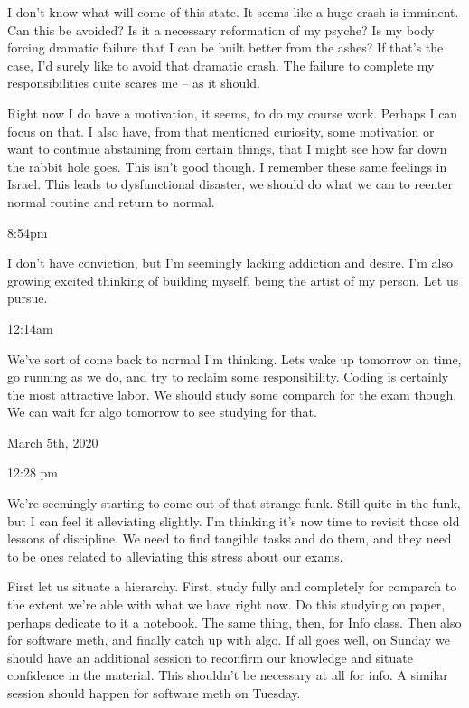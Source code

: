 I don't know what will come of this state. It seems like a huge crash is
imminent. Can this be avoided? Is it a necessary reformation of my
psyche? Is my body forcing dramatic failure that I can be built better
from the ashes? If that's the case, I'd surely like to avoid that
dramatic crash. The failure to complete my responsibilities quite scares
me -- as it should.

Right now I do have a motivation, it seems, to do my course work.
Perhaps I can focus on that. I also have, from that mentioned curiosity,
some motivation or want to continue abstaining from certain things, that
I might see how far down the rabbit hole goes. This isn't good though. I
remember these same feelings in Israel. This leads to dysfunctional
disaster, we should do what we can to reenter normal routine and return
to normal.

8:54pm

I don't have conviction, but I'm seemingly lacking addiction and desire.
I'm also growing excited thinking of building myself, being the artist
of my person. Let us pursue.

12:14am

We've sort of come back to normal I'm thinking. Lets wake up tomorrow on
time, go running as we do, and try to reclaim some responsibility.
Coding is certainly the most attractive labor. We should study some
comparch for the exam though. We can wait for algo tomorrow to see
studying for that.

\bigskip
\bigskip
March 5th, 2020

12:28 pm

We're seemingly starting to come out of that strange funk. Still quite
in the funk, but I can feel it alleviating slightly. I'm thinking it's
now time to revisit those old lessons of discipline. We need to find
tangible tasks and do them, and they need to be ones related to
alleviating this stress about our exams.

First let us situate a hierarchy. First, study fully and completely for
comparch to the extent we're able with what we have right now. Do this
studying on paper, perhaps dedicate to it a notebook. The same thing,
then, for Info class. Then also for software meth, and finally catch up
with algo. If all goes well, on Sunday we should have an additional
session to reconfirm our knowledge and situate confidence in the
material. This shouldn't be necessary at all for info. A similar session
should happen for software meth on Tuesday.

\bigskip
\bigskip
